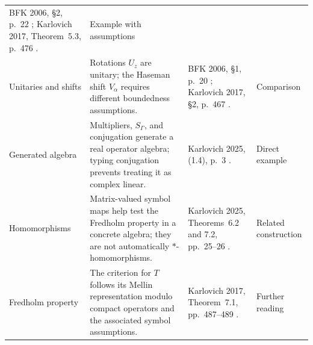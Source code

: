 \begin{longtable}{>{\raggedright\arraybackslash}p{2.5cm}>{\raggedright\arraybackslash}p{5.5cm}>{\raggedright\arraybackslash}p{3.6cm}>{\raggedright\arraybackslash}p{2.0cm}}
BFK 2006, §2, p.~22 \cite{BFK2006}; Karlovich 2017, Theorem~5.3, p.~476 \cite{Karlovich2017}. &
Example with assumptions\\
Unitaries and shifts &
Rotations $U_z$ are unitary; the Haseman shift $V_\alpha$
requires different boundedness assumptions. &
BFK 2006, §1, p.~20 \cite{BFK2006}; Karlovich 2017, §2, p.~467 \cite{Karlovich2017}. &
Comparison\\
Generated algebra &
Multipliers, $S_\Gamma$, and conjugation generate a real operator
algebra; typing conjugation prevents treating it as complex linear. &
Karlovich 2025, (1.4), p.~3 \cite{Karlovich2025}. &
Direct example\\
Homomorphisms &
Matrix-valued symbol maps help test the Fredholm property in a concrete
algebra; they are not automatically $*$-homomorphisms. &
Karlovich 2025, Theorems~6.2 and 7.2, pp.~25--26 \cite{Karlovich2025}. &
Related construction\\
Fredholm property &
The criterion for $T$ follows its Mellin representation modulo
compact operators and the associated symbol assumptions. &
Karlovich 2017, Theorem~7.1, pp.~487--489 \cite{Karlovich2017}. &
Further reading\\
\bottomrule
\end{longtable}
\normalsize
